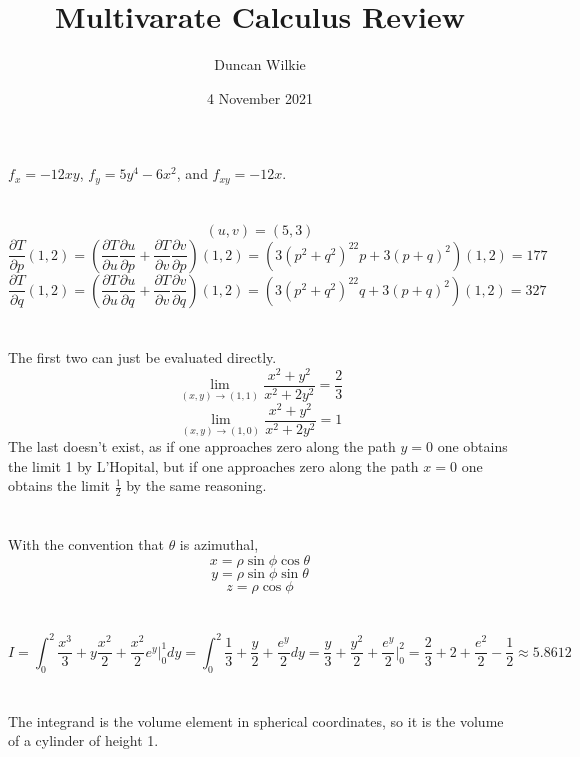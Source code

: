 \documentclass{article}
\title{Multivarate Calculus Review}
\author{Duncan Wilkie}
\date{4 November 2021}
\begin{document}
\maketitle

\section{}
$f_x=-12xy$, $f_y=5y^4-6x^2$, and $f_{xy}=-12x$.

\section{}
\[(u,v)=(5,3)\]
\[\frac{\partial T}{\partial p}(1,2)=\left( \frac{\partial T}{\partial u}\frac{\partial u}{\partial p}+\frac{\partial T}{\partial v}\frac{\partial v}{\partial p}\right)(1,2)=\left( 3(p^2+q^2)^22p+3(p+q)^2 \right)(1,2)=177\]
\[\frac{\partial T}{\partial q}(1,2)=\left( \frac{\partial T}{\partial u}\frac{\partial u}{\partial q}+\frac{\partial T}{\partial v}\frac{\partial v}{\partial q} \right)(1,2)=\left( 3(p^2+q^2)^22q+3(p+q)^2 \right)(1,2)=327\]

\section{}
The first two can just be evaluated directly.
\[\lim_{(x,y)\to (1,1)}\frac{x^2+y^2}{x^2+2y^2}=\frac{2}{3}\]
\[\lim_{(x,y)\to(1,0)}\frac{x^2+y^2}{x^2+2y^2}=1\]
The last doesn't exist, as if one approaches zero along the path $y=0$ one obtains the limit 1 by L'Hopital, but if one approaches zero along the path $x=0$ one obtains the limit $\frac{1}{2}$ by the same reasoning.

\section{}
With the convention that $\theta$ is azimuthal,
\[x=\rho\sin\phi\cos\theta\]
\[y=\rho\sin\phi\sin\theta\]
\[z=\rho\cos\phi\]

\section{}
\[I=\int_0^2\frac{x^3}{3}+y\frac{x^2}{2}+\frac{x^2}{2}e^y\bigg|_0^1dy=\int_0^2\frac{1}{3}+\frac{y}{2}+\frac{e^y}{2}dy=\frac{y}{3}+\frac{y^2}{2}+\frac{e^y}{2}\bigg|_0^2=\frac{2}{3}+2+\frac{e^2}{2}-\frac{1}{2}\approx 5.8612\]

\section{}
The integrand is the volume element in spherical coordinates, so it is the volume of a cylinder of height 1.
\end{document}
